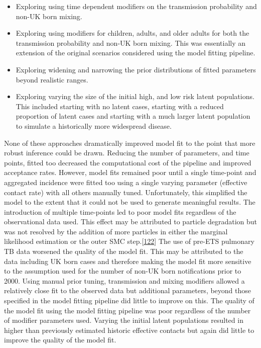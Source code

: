 \documentclass[11pt,twoside]{bristolthesis}
\begin{document}
\begin{itemize}
  \item
    Exploring using time dependent modifiers on the transmission probability and non-UK born mixing.
  \item
    Exploring using modifiers for children, adults, and older adults for both the transmission probability and non-UK born mixing. This was essentially an extension of the original scenarios considered using the model fitting pipeline.
  \item
    Exploring widening and narrowing the prior distributions of fitted parameters beyond realistic ranges.
  \item
    Exploring varying the size of the initial high, and low risk latent populations. This included starting with no latent cases, starting with a reduced proportion of latent cases and starting with a much larger latent population to simulate a historically more widespread disease.
  \end{itemize}
  None of these approaches dramatically improved model fit to the point that more robust inference could be drawn. Reducing the number of parameters, and time points, fitted too decreased the computational cost of the pipeline and improved acceptance rates. However, model fits remained poor until a single time-point and aggregated incidence were fitted too using a single varying parameter (effective contact rate) with all others manually tuned. Unfortunately, this simplified the model to the extent that it could not be used to generate meaningful results. The introduction of multiple time-points led to poor model fits regardless of the observational data used. This effect may be attributed to particle degradation but was not resolved by the addition of more particles in either the marginal likelihood estimation or the outer SMC step.{[}\protect\hyperlink{ref-Murray2015}{122}{]} The use of pre-ETS pulmonary TB data worsened the quality of the model fit. This may be attributed to the data including UK born cases and therefore making the model fit more sensitive to the assumption used for the number of non-UK born notifications prior to 2000. Using manual prior tuning, transmission and mixing modifiers allowed a relatively close fit to the observed data but additional parameters, beyond those specified in the model fitting pipeline did little to improve on this. The quality of the model fit using the model fitting pipeline was poor regardless of the number of modifier parameters used. Varying the initial latent populations resulted in higher than previously estimated historic effective contacts but again did little to improve the quality of the model fit.
  
\end{document}
